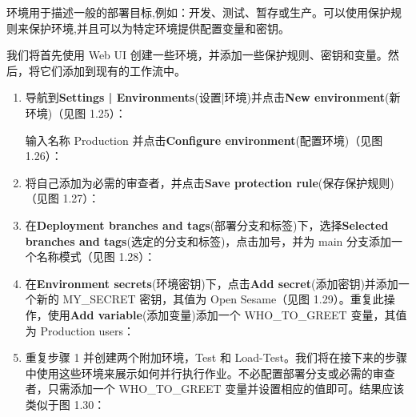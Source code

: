 
环境用于描述一般的部署目标,例如：开发、测试、暂存或生产。可以使用保护规则来保护环境,并且可以为特定环境提供配置变量和密钥。


我们将首先使用 Web UI 创建一些环境，并添加一些保护规则、密钥和变量。然后，将它们添加到现有的工作流中。


\begin{enumerate}
\item 
导航到\textbf{Settings | Environments}(设置|环境)并点击\textbf{New environment}(新环境)（见图 1.25）：


输入名称 Production 并点击\textbf{Configure environment}(配置环境)（见图 1.26）：


\item 
将自己添加为必需的审查者，并点击\textbf{Save protection rule}(保存保护规则)（见图 1.27）：


\item 
在\textbf{Deployment branches and tags}(部署分支和标签)下，选择\textbf{Selected branches and tags}(选定的分支和标签)，点击加号，并为 main 分支添加一个名称模式（见图 1.28）：


\item 
在\textbf{Environment secrets}(环境密钥)下，点击\textbf{Add secret}(添加密钥)并添加一个新的 MY\_SECRET 密钥，其值为 Open Sesame（见图 1.29）。重复此操作，使用\textbf{Add variable}(添加变量)添加一个 WHO\_TO\_GREET 变量，其值为 Production users：


\item 
重复步骤 1 并创建两个附加环境，Test 和 Load-Test。我们将在接下来的步骤中使用这些环境来展示如何并行执行作业。不必配置部署分支或必需的审查者，只需添加一个 WHO\_TO\_GREET 变量并设置相应的值即可。结果应该类似于图 1.30：



\end{enumerate}
